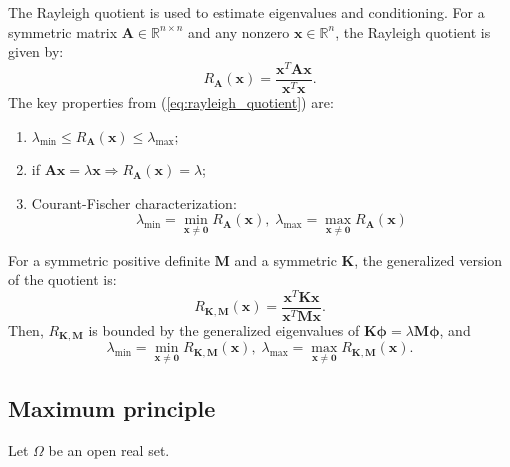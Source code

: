 \documentclass{article}
\begin{document}
The Rayleigh quotient is used to estimate eigenvalues and conditioning. For a symmetric matrix $\mathbf{A} \in \mathbb{R}^{n \times n}$ and any nonzero $\mathbf{x} \in \mathbb{R}^n$, the Rayleigh quotient is given by:
\begin{equation}\label{eq:rayleigh_quotient}
    R_{\mathbf{A}} (\mathbf{x}) = \frac{\mathbf{x}^T\mathbf{A}\mathbf{x}}{\mathbf{x}^T \mathbf{x}}.
\end{equation}
The key properties from (\ref{eq:rayleigh_quotient}) are:
\begin{enumerate}
    \item $\lambda_{\min} \leq R_{\mathbf{A}}(\mathbf{x}) \leq \lambda_{\max}$;
    \item if $\mathbf{A} \mathbf{x} = \lambda \mathbf{x} \Rightarrow R_{\mathbf{A}}(\mathbf{x}) = \lambda$;
    \item Courant-Fischer characterization:
    \begin{equation}
        \nonumber
        \lambda_{\min} = \min \limits_{\mathbf{x} \neq \mathbf{0}} R_{\mathbf{A}}(\mathbf{x}), \; \lambda_{\max}  = \max \limits_{\mathbf{x} \neq \mathbf{0}} R_{\mathbf{A}}(\mathbf{x})    
    \end{equation}
\end{enumerate}

For a symmetric positive definite $\mathbf{M}$ and a symmetric $\mathbf{K}$, the generalized version of the quotient is:
\begin{equation}
    \nonumber
    R_{\mathbf{K},\mathbf{M}} (\mathbf{x}) = \frac{\mathbf{x}^T \mathbf{K}\mathbf{x}}{\mathbf{x}^T \mathbf{M}\mathbf{x}}.
\end{equation}
Then, $R_{\mathbf{K},\mathbf{M}}$ is bounded by the generalized eigenvalues of $\mathbf{K}\mathbf{\phi} = \lambda \mathbf{M}\mathbf{\phi}$, and
\begin{equation}
    \nonumber
    \lambda_{\min} = \min \limits_{\mathbf{x} \neq \mathbf{0}} R_{\mathbf{K},\mathbf{M}} (\mathbf{x}), \; \lambda_{\max} = \max \limits_{\mathbf{x} \neq \mathbf{0}} R_{\mathbf{K},\mathbf{M}} (\mathbf{x}).
\end{equation}

\subsection{Maximum principle}
\label{ap:maximum_principle}
Let $\Omega$ be an open real set.
\end{document}

